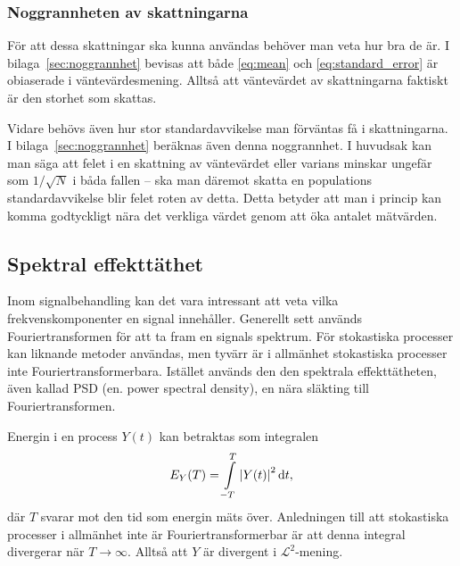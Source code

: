 \subsubsection{Noggrannheten av skattningarna}
För att dessa skattningar ska kunna användas behöver man veta hur bra de är. I bilaga~\ref{sec:noggrannhet} bevisas att både \eqref{eq:mean} och \eqref{eq:standard_error} är obiaserade i väntevärdesmening. Alltså att väntevärdet av skattningarna faktiskt är den storhet som skattas.

Vidare behövs även hur stor standardavvikelse man förväntas få i skattningarna. I bilaga~\ref{sec:noggrannhet} beräknas även denna noggrannhet. I huvudsak kan man säga att felet i en skattning av väntevärdet eller varians\footnotemark{} minskar ungefär som $1/\sqrt{N}$ i båda fallen -- ska man däremot skatta en populations standardavvikelse blir felet roten av detta. 
Detta betyder att man i princip kan komma godtyckligt nära det verkliga värdet genom att öka antalet mätvärden.




\subsection{Spektral effekttäthet}

Inom signalbehandling kan det vara intressant att veta vilka frekvenskomponenter en signal innehåller. Generellt sett används Fouriertransformen för att ta fram en signals spektrum.
För stokastiska processer kan liknande metoder användas, men tyvärr är i allmänhet stokastiska processer inte Fouriertransformerbara. Istället används den den spektrala effekttätheten, även kallad PSD (en. power spectral density), en nära släkting till Fouriertransformen.

Energin i en process $Y(t)$ kan betraktas som integralen
\begin{equation}\label{eq:energy}
E_Y(T) = \int_{-T}^{T} \abs{Y(t)}^2\id{t},
\end{equation}
där $T$ svarar mot den tid som energin mäts över. Anledningen till att stokastiska processer i allmänhet inte är Fouriertransformerbar är att denna integral divergerar när $T\to\infty$. Alltså att $Y$ är divergent i $\mathcal{L}^2$-mening. 

